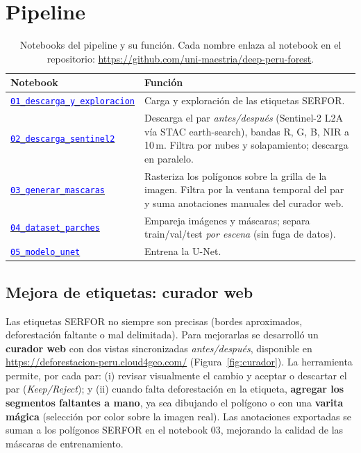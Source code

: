 \documentclass[onecolumn,conference]{IEEEtran}
\newcommand{\repo}{https://github.com/uni-maestria/deep-peru-forest}
\newcommand{\nb}[1]{\href{\repo/blob/main/#1.ipynb}{\texttt{\textcolor{blue}{#1}}}}
\begin{document}
\section{Pipeline}

\begin{table}[t]
\centering
\small
\begin{tabularx}{\textwidth}{@{}lX@{}}
\toprule
\textbf{Notebook} & \textbf{Función} \\
\midrule
\nb{01\_descarga\_y\_exploracion} & Carga y exploración de las etiquetas SERFOR. \\
\nb{02\_descarga\_sentinel2} & Descarga el par \emph{antes/después} (Sentinel-2 L2A vía STAC earth-search), bandas R, G, B, NIR a 10\,m. Filtra por nubes y solapamiento; descarga en paralelo. \\
\nb{03\_generar\_mascaras} & Rasteriza los polígonos sobre la grilla de la imagen. Filtra por la ventana temporal del par y suma anotaciones manuales del curador web. \\
\nb{04\_dataset\_parches} & Empareja imágenes y máscaras; separa train/val/test \emph{por escena} (sin fuga de datos). \\
\nb{05\_modelo\_unet} & Entrena la U-Net. \\
\bottomrule
\end{tabularx}
\caption{Notebooks del pipeline y su función. Cada nombre enlaza al notebook en el
repositorio: \url{https://github.com/uni-maestria/deep-peru-forest}.}
\label{tab:pipeline}
\end{table}





\subsection*{Mejora de etiquetas: curador web}

Las etiquetas SERFOR no siempre son precisas (bordes aproximados, deforestación faltante o
mal delimitada). Para mejorarlas se desarrolló un \textbf{curador web} con dos vistas
sincronizadas \emph{antes/después}, disponible en
\url{https://deforestacion-peru.cloud4geo.com/} (Figura~\ref{fig:curador}). La herramienta
permite, por cada par: (i) revisar visualmente el cambio y aceptar o descartar el par
(\emph{Keep/Reject}); y (ii) cuando falta deforestación en la etiqueta, \textbf{agregar los
segmentos faltantes a mano}, ya sea dibujando el polígono o con una \textbf{varita mágica}
(selección por color sobre la imagen real). Las anotaciones exportadas se suman a los
polígonos SERFOR en el notebook 03, mejorando la calidad de las máscaras de entrenamiento.
\end{document}
